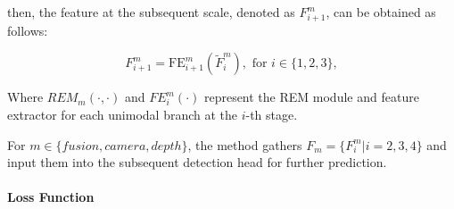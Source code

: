 \documentclass[report.tex]{subfiles}
\begin{document}
    then, the feature at the subsequent scale, denoted as $F_{i+1}^{m}$, can be obtained as follows:


    \begin{equation}
        F_{i+1}^{m} = \text{FE}_{i+1}^{m} (\tilde{F}_{i}^{m}), \text{ for } i \in \{1, 2, 3\},
    \end{equation}
        

    

    Where $REM_{m}(\cdot, \cdot)$ and $FE_{i}^{m}(\cdot)$ represent the REM module and feature extractor for each unimodal branch at the $i$-th stage.

    For $m \in \{fusion, camera, depth\}$, the method gathers $F_{m} = \{F_{i}^{m} | i = 2, 3, 4\}$ and input them into the subsequent detection head for further prediction.



    \paragraph*{Loss Function}


\end{document}

